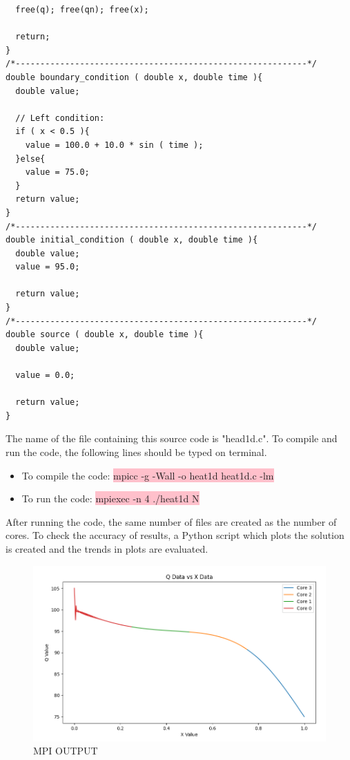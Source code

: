 \documentclass{article}
\begin{document}
\begin{verbatim}
  free(q); free(qn); free(x);

  return;
}
/*-----------------------------------------------------------*/
double boundary_condition ( double x, double time ){
  double value;

  // Left condition:
  if ( x < 0.5 ){
    value = 100.0 + 10.0 * sin ( time );
  }else{
    value = 75.0;
  }
  return value;
}
/*-----------------------------------------------------------*/
double initial_condition ( double x, double time ){
  double value;
  value = 95.0;

  return value;
}
/*-----------------------------------------------------------*/
double source ( double x, double time ){
  double value;

  value = 0.0;

  return value;
}
\end{verbatim}

The name of the file containing this source code is "head1d.c". To compile and run the code, the following lines should be typed on terminal. 

\begin{itemize}
\color{black}
\item To compile the code: \colorbox{pink}{mpicc -g -Wall -o heat1d heat1d.c -lm}
\item To run the code: \colorbox{pink}{mpiexec -n 4 ./heat1d N}
\end{itemize}

\noindent

After running the code, the same number of files are created as the number of cores. To check the accuracy of results, a Python script which plots the solution is created and the trends in plots are evaluated. 

\begin{figure}[hbt!]
    \centering
    \includegraphics[width=1.2\textwidth]{Figures/MPI.png}
    \caption{MPI OUTPUT}
    \label{figure_1}
\end{figure}
\end{document}

